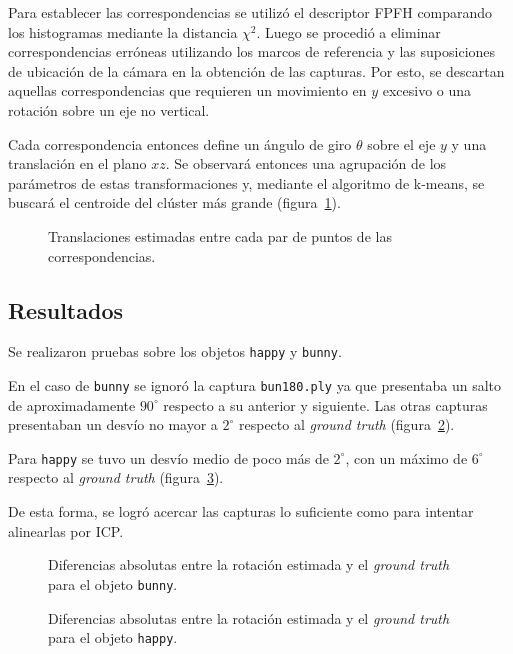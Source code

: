 		Para establecer las correspondencias se utilizó el descriptor FPFH
		comparando los histogramas mediante la distancia $\chi^2$. 
		Luego se
		procedió a eliminar correspondencias erróneas utilizando los marcos de
		referencia y las suposiciones de ubicación de la cámara en la obtención
		de las capturas.  Por esto, se descartan aquellas correspondencias que
		requieren un movimiento en $y$ excesivo o una rotación sobre un eje no
		vertical. 

		Cada correspondencia entonces define un ángulo de giro $\theta$ sobre
		el eje $y$ y una translación en el plano $xz$.  Se observará entonces
		una agrupación de los parámetros de estas transformaciones y, mediante el
		algoritmo de k-means, se buscará el centroide del clúster más grande (figura~\ref{fig:cluster}).
		\begin{figure}
			\caption{\label{fig:cluster}Translaciones estimadas entre cada par
			de puntos de las correspondencias.}
		\end{figure}

		\subsection{Resultados}
			Se realizaron pruebas sobre los objetos \texttt{happy} y \texttt{bunny}.

			En el caso de \texttt{bunny} se ignoró la captura
			\texttt{bun180.ply} ya que presentaba un salto de aproximadamente
			$90^{\circ}$ respecto a su anterior y siguiente.  Las otras
			capturas presentaban un desvío no mayor a $2^{\circ}$ respecto al
			\emph{ground truth} (figura~\ref{fig:clust_bunny}).

			Para \texttt{happy} se tuvo un desvío medio de poco más de
			$2^{\circ}$, con un máximo de $6^{\circ}$ respecto al \emph{ground truth} (figura~\ref{fig:clust_happy}).

			De esta forma, se logró acercar las capturas lo suficiente como
			para intentar alinearlas por ICP.

		\begin{figure}
			\caption{\label{fig:clust_bunny}Diferencias absolutas entre la rotación estimada y el \emph{ground truth} para el objeto \texttt{bunny}.}
		\end{figure}

		\begin{figure}
			\caption{\label{fig:clust_happy}Diferencias absolutas entre la rotación estimada y el \emph{ground truth} para el objeto \texttt{happy}.}
		\end{figure}

